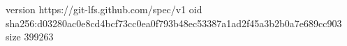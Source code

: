 version https://git-lfs.github.com/spec/v1
oid sha256:d03280ac0e8cd4bcf73cc0ea0f793b48ec53387a1ad2f45a3b2b0a7e689cc903
size 399263
